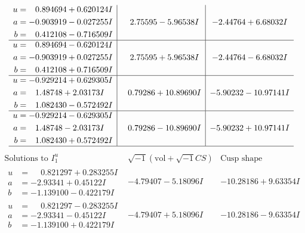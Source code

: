 \documentclass[1p]{elsarticle_modified}
\theoremstyle{definition}
\newcommand{\I}{\sqrt{-1}}
\begin{document}
$$\begin{array}{c|c|c}
\begin{aligned}
u &= \phantom{-}0.894694 + 0.620124 I \\
a &= -0.903919 - 0.027255 I \\
b &= \phantom{-}0.412108 - 0.716509 I\end{aligned}
 & \phantom{-}2.75595 - 5.96538 I & -2.44764 + 6.68032 I \\ \hline\begin{aligned}
u &= \phantom{-}0.894694 - 0.620124 I \\
a &= -0.903919 + 0.027255 I \\
b &= \phantom{-}0.412108 + 0.716509 I\end{aligned}
 & \phantom{-}2.75595 + 5.96538 I & -2.44764 - 6.68032 I \\ \hline\begin{aligned}
u &= -0.929214 + 0.629305 I \\
a &= \phantom{-}1.48748 + 2.03173 I \\
b &= \phantom{-}1.082430 - 0.572492 I\end{aligned}
 & \phantom{-}0.79286 + 10.89690 I & -5.90232 - 10.97141 I \\ \hline\begin{aligned}
u &= -0.929214 - 0.629305 I \\
a &= \phantom{-}1.48748 - 2.03173 I \\
b &= \phantom{-}1.082430 + 0.572492 I\end{aligned}
 & \phantom{-}0.79286 - 10.89690 I & -5.90232 + 10.97141 I\\
 \hline 
 \end{array}$$\newpage$$\begin{array}{c|c|c}  
\text{Solutions to }I^u_{1}& \I (\text{vol} + \sqrt{-1}CS) & \text{Cusp shape}\\
 \hline 
\begin{aligned}
u &= \phantom{-}0.821297 + 0.283255 I \\
a &= -2.93341 + 0.45122 I \\
b &= -1.139100 - 0.422179 I\end{aligned}
 & -4.79407 - 5.18096 I & -10.28186 + 9.63354 I \\ \hline\begin{aligned}
u &= \phantom{-}0.821297 - 0.283255 I \\
a &= -2.93341 - 0.45122 I \\
b &= -1.139100 + 0.422179 I\end{aligned}
 & -4.79407 + 5.18096 I & -10.28186 - 9.63354 I \\ \hline\begin{aligned}

\end{aligned}
\end{array}$$
\end{document}
